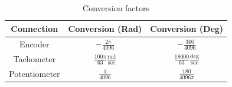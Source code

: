 \begin{table}[htbp]
    \centering
    \begin{tabular}{c c c }
        Connection    & Conversion (Rad)                                    & Conversion (Deg)                                   \\\bottomrule
        Encoder       & \(-\frac{2\pi}{4096}\)                              & \(-\frac{360}{4096}\)                              \\
        Tachometer    & \(\frac{100\pi}{63} \frac{\text{rad}}{\text{sec}}\) & \(\frac{18000}{63} \frac{\text{deg}}{\text{sec}}\) \\
        Potentiometer & \(\frac{1}{4096}\)                                  & \(\frac{180}{4096\pi}\)                            \\
    \end{tabular}
    \caption{Conversion factors}\label{tab:conversionFactors}
\end{table}

